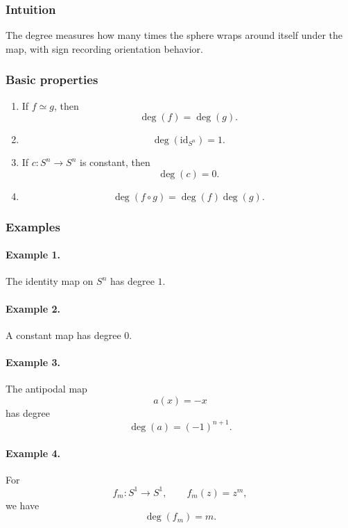 \documentclass[12pt,a4paper]{article}
\theoremstyle{notespace}
\begin{document}
\subsubsection*{Intuition}

The degree measures how many times the sphere wraps around itself under the map, with sign recording orientation behavior.

\subsubsection*{Basic properties}

\begin{enumerate}
	\item If \(f\simeq g\), then
	\[
	\deg(f)=\deg(g).
	\]
	
	\item
	\[
	\deg(\mathrm{id}_{S^n})=1.
	\]
	
	\item If \(c:S^n\to S^n\) is constant, then
	\[
	\deg(c)=0.
	\]
	
	\item
	\[
	\deg(f\circ g)=\deg(f)\deg(g).
	\]
\end{enumerate}

\subsubsection*{Examples}

\paragraph{Example 1.}
The identity map on \(S^n\) has degree \(1\).

\paragraph{Example 2.}
A constant map has degree \(0\).

\paragraph{Example 3.}
The antipodal map
\[
a(x)=-x
\]
has degree
\[
\deg(a)=(-1)^{n+1}.
\]

\paragraph{Example 4.}
For
\[
f_m:S^1\to S^1,\qquad f_m(z)=z^m,
\]
we have
\[
\deg(f_m)=m.
\]
\end{document}
